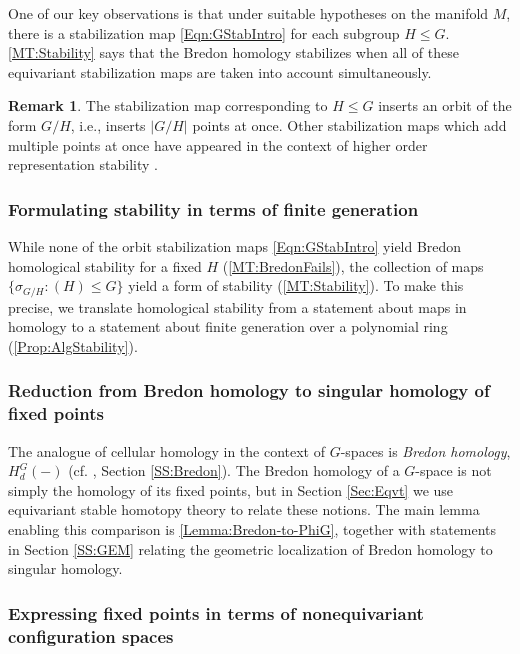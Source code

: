 \documentclass[11pt]{amsart}
\theoremstyle{definition}
\newtheorem{remark}[equation]{Remark}
\numberwithin{equation}{subsection} %
\begin{document}
One of our key observations is that under suitable hypotheses on the manifold $M$, there is a stabilization map \eqref{Eqn:GStabIntro} for each subgroup $H \leq G$. \cref{MT:Stability} says that the Bredon homology stabilizes when all of these equivariant stabilization maps are taken into account simultaneously. 

\begin{remark}
The stabilization map corresponding to $H \leq G$ inserts an orbit of the form $G/H$, i.e., inserts $|G/H|$ points at once. Other stabilization maps which add multiple points at once have appeared in the context of higher order representation stability \cite{MW19}.
\end{remark}

\subsubsection{Formulating stability in terms of finite generation}

While none of the orbit stabilization maps \eqref{Eqn:GStabIntro} yield Bredon homological stability for a fixed $H$ (\cref{MT:BredonFails}), the collection of maps $\{ \sigma_{G/H} : (H) \leq G\}$ yield a form of stability (\cref{MT:Stability}). To make this precise, we translate homological stability from a statement about maps in homology to a statement about finite generation over a polynomial ring (\cref{Prop:AlgStability}). 

\subsubsection{Reduction from Bredon homology to singular homology of fixed points}
The analogue of cellular homology in the context of $G$-spaces is \emph{Bredon homology},
$H^G_d(-)$ (cf. \cite[XIII.4.1]{May96}, Section \ref{SS:Bredon}). The Bredon
homology of a $G$-space is not simply the homology of its fixed points, but in
Section \ref{Sec:Eqvt} we use equivariant stable homotopy theory to relate these
notions. The main lemma enabling this comparison is
\cref{Lemma:Bredon-to-PhiG}, together with statements in Section \ref{SS:GEM} relating the geometric localization of Bredon homology to singular homology.

\subsubsection{Expressing fixed points in terms of nonequivariant configuration spaces}
\end{document}

